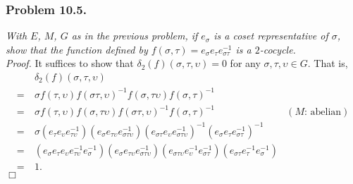 \documentclass{article}
\begin{document}



\subsubsection*{Problem 10.5.}
\emph{With $E$, $M$, $G$ as in the previous problem,
if $e_{\sigma}$ is a coset representative of $\sigma$,
show that the function defined by
$f(\sigma,\tau) = e_{\sigma}e_{\tau}e_{\sigma\tau}^{-1}$ is a $2$-cocycle.} \\



\emph{Proof.}
  It suffices to show that $\delta_2(f)(\sigma, \tau, \upsilon) = 0$
  for any $\sigma, \tau, \upsilon \in G$.
  That is,
  \begin{align*}
    & \:
    \delta_2(f)(\sigma, \tau, \upsilon) \\
    = & \: \sigma f(\tau, \upsilon)
        f(\sigma \tau, \upsilon)^{-1}
        f(\sigma, \tau \upsilon)
        f(\sigma, \tau)^{-1} \\
    = & \: \sigma f(\tau, \upsilon)
        f(\sigma, \tau \upsilon)
        f(\sigma \tau, \upsilon)^{-1}
        f(\sigma, \tau)^{-1}
      &(\text{$M$: abelian}) \\
    = & \: \sigma (e_{\tau}e_{\upsilon}e_{\tau\upsilon}^{-1})
        (e_{\sigma}e_{\tau\upsilon}e_{\sigma\tau\upsilon}^{-1})
        (e_{\sigma\tau}e_{\upsilon}e_{\sigma\tau\upsilon}^{-1})^{-1}
        (e_{\sigma}e_{\tau}e_{\sigma\tau}^{-1})^{-1} \\
    = & \: (e_{\sigma} e_{\tau}e_{\upsilon}e_{\tau\upsilon}^{-1} e_{\sigma}^{-1})
        (e_{\sigma}e_{\tau\upsilon}e_{\sigma\tau\upsilon}^{-1})
        (e_{\sigma\tau\upsilon}e_{\upsilon}^{-1}e_{\sigma\tau}^{-1})
        (e_{\sigma\tau}e_{\tau}^{-1}e_{\sigma}^{-1}) \\
    = & \: 1.
  \end{align*}
$\Box$ \\\\



\end{document}
